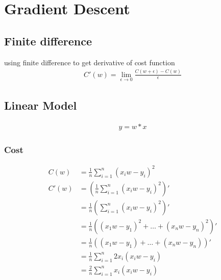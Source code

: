 \documentclass{article}
\begin{document}
\section{Gradient Descent}
\subsection{Finite difference}
using finite difference to get derivative of cost function
\begin{align}
  C'(w) = \lim_{\epsilon \to 0 }\frac{C(w+\epsilon)-C(w)}\epsilon
\end{align}

\subsection{Linear Model}
\begin{center}
\end{center}
\begin{align}
	y = w * x
\end{align}

\subsubsection{Cost}
\begin{align}
	C(w) &= \frac{1}{n}\sum_{i=1}^{n}(x_iw -y_i)^2 	\\
	C'(w) &= \left(\frac{1}{n}\sum_{i=1}^{n}(x_iw -y_i)^2\right)' \\
	&=\frac{1}{n}\left(\sum_{i=1}^{n}(x_iw -y_i)^2\right)' \\
	&=\frac{1}{n}\left((x_1w-y_1)^2+\hdots+(x_nw-y_n)^2\right)' \\
	&=\frac{1}{n}\left((x_1w-y_1)+\hdots+(x_nw-y_n)\right)' \\
 &=  \frac{1}{n}\sum_{i=1}^{n}2x_i(x_iw -y_i)\\
	&=  \frac{2}{n}\sum_{i=1}^{n}x_i(x_iw -y_i)
\end{align}
\end{document}
